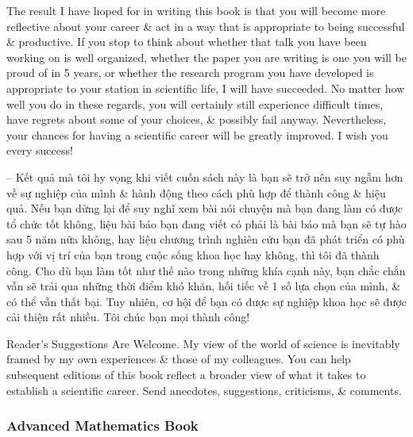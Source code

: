 \documentclass{article}
\begin{document}
\begin{enumerate}
\begin{itemize}
		The result I have hoped for in writing this book is that you will become more reflective about your career \& act in a way that is appropriate to being successful \& productive. If you stop to think about whether that talk you have been working on is well organized, whether the paper you are writing is one you will be proud of in 5 years, or whether the research program you have developed is appropriate to your station in scientific life, I will have succeeded. No matter how well you do in these regards, you will certainly still experience difficult times, have regrets about some of your choices, \& possibly fail anyway. Nevertheless, your chances for having a scientific career will be greatly improved. I wish you every success!

		-- Kết quả mà tôi hy vọng khi viết cuốn sách này là bạn sẽ trở nên suy ngẫm hơn về sự nghiệp của mình \& hành động theo cách phù hợp để thành công \& hiệu quả. Nếu bạn dừng lại để suy nghĩ xem bài nói chuyện mà bạn đang làm có được tổ chức tốt không, liệu bài báo bạn đang viết có phải là bài báo mà bạn sẽ tự hào sau 5 năm nữa không, hay liệu chương trình nghiên cứu bạn đã phát triển có phù hợp với vị trí của bạn trong cuộc sống khoa học hay không, thì tôi đã thành công. Cho dù bạn làm tốt như thế nào trong những khía cạnh này, bạn chắc chắn vẫn sẽ trải qua những thời điểm khó khăn, hối tiếc về 1 số lựa chọn của mình, \& có thể vẫn thất bại. Tuy nhiên, cơ hội để bạn có được sự nghiệp khoa học sẽ được cải thiện rất nhiều. Tôi chúc bạn mọi thành công!
	\end{itemize}
	{\sf Reader's Suggestions Are Welcome.} My view of the world of science is inevitably framed by my own experiences \& those of my colleagues. You can help subsequent editions of this book reflect a broader view of what it takes to establish a scientific career. Send anecdotes, suggestions, criticisms, \& comments.
\end{enumerate}

\subsubsection{Advanced Mathematics Book}
\end{document}
